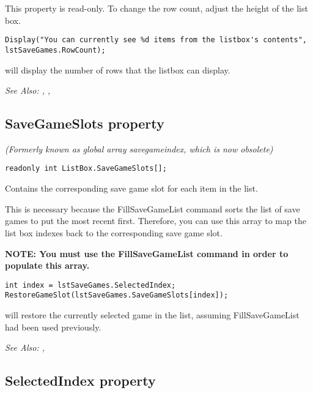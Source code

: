 This property is read-only. To change the row count, adjust the height of the list box.

\begin{verbatim}
Display("You can currently see %d items from the listbox's contents", lstSaveGames.RowCount);
\end{verbatim}
will display the number of rows that the listbox can display.

\it{See Also:} , ,


\subsection{SaveGameSlots property}\label{ListBox.SaveGameSlots}%

\it{(Formerly known as global array savegameindex, which is now obsolete)}

\begin{verbatim}
readonly int ListBox.SaveGameSlots[];
\end{verbatim}
Contains the corresponding save game slot for each item in the list.

This is necessary because the FillSaveGameList command sorts the list
of save games to put the most recent first. Therefore, you can use this
array to map the list box indexes back to the corresponding save game slot.

\bf{NOTE:} You must use the FillSaveGameList command in order to populate
this array.

\begin{verbatim}
int index = lstSaveGames.SelectedIndex;
RestoreGameSlot(lstSaveGames.SaveGameSlots[index]);
\end{verbatim}
will restore the currently selected game in the list, assuming FillSaveGameList
had been used previously.

\it{See Also:} ,


\subsection{SelectedIndex property}\label{ListBox.SelectedIndex}%


